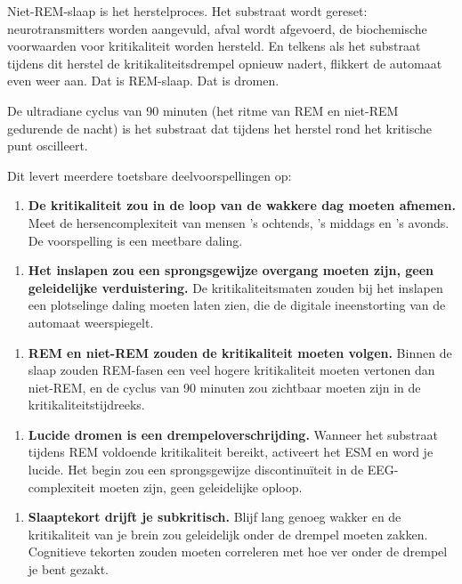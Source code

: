 \documentclass[11pt, twoside, openright]{book}
\begin{document}
Niet-REM-slaap is het herstelproces. Het substraat wordt gereset: neurotransmitters worden aangevuld, afval wordt afgevoerd, de biochemische voorwaarden voor kritikaliteit worden hersteld. En telkens als het substraat tijdens dit herstel de kritikaliteitsdrempel opnieuw nadert, flikkert de automaat even weer aan. Dat is REM-slaap. Dat is dromen.

De ultradiane cyclus van 90 minuten (het ritme van REM en niet-REM gedurende de nacht) is het substraat dat tijdens het herstel rond het kritische punt oscilleert.

Dit levert meerdere toetsbare deelvoorspellingen op:

\begin{enumerate}
  \item \textbf{De kritikaliteit zou in de loop van de wakkere dag moeten afnemen.} Meet de hersencomplexiteit van mensen 's ochtends, 's middags en 's avonds. De voorspelling is een meetbare daling.
\end{enumerate}

\begin{enumerate}
  \item \textbf{Het inslapen zou een sprongsgewijze overgang moeten zijn, geen geleidelijke verduistering.} De kritikaliteitsmaten zouden bij het inslapen een plotselinge daling moeten laten zien, die de digitale ineenstorting van de automaat weerspiegelt.
\end{enumerate}

\begin{enumerate}
  \item \textbf{REM en niet-REM zouden de kritikaliteit moeten volgen.} Binnen de slaap zouden REM-fasen een veel hogere kritikaliteit moeten vertonen dan niet-REM, en de cyclus van 90 minuten zou zichtbaar moeten zijn in de kritikaliteitstijdreeks.
\end{enumerate}

\begin{enumerate}
  \item \textbf{Lucide dromen is een drempeloverschrijding.} Wanneer het substraat tijdens REM voldoende kritikaliteit bereikt, activeert het ESM en word je lucide. Het begin zou een sprongsgewijze discontinuïteit in de EEG-complexiteit moeten zijn, geen geleidelijke oploop.
\end{enumerate}

\begin{enumerate}
  \item \textbf{Slaaptekort drijft je subkritisch.} Blijf lang genoeg wakker en de kritikaliteit van je brein zou geleidelijk onder de drempel moeten zakken. Cognitieve tekorten zouden moeten correleren met hoe ver onder de drempel je bent gezakt.
\end{enumerate}
\end{document}
